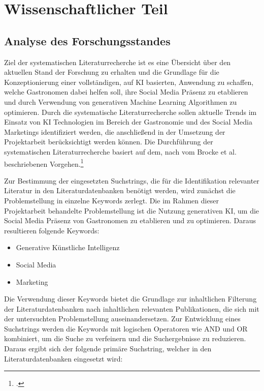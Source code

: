 \newpage
\section{Wissenschaftlicher Teil}

\subsection{Analyse des Forschungsstandes}
Ziel der systematischen Literaturrecherche ist es eine Übersicht über den aktuellen Stand der Forschung zu erhalten und die Grundlage für die Konzeptionierung einer vollständigen, auf \ac{KI} basierten, Anwendung zu schaffen, welche Gastronomen dabei helfen soll, ihre Social Media Präsenz zu etablieren und durch Verwendung von generativen Machine Learning Algorithmen zu optimieren.
Durch die systematische Literaturrecherche sollen aktuelle Trends im Einsatz von \ac{KI} Technologien im Bereich der Gastronomie und des Social Media Marketings identifiziert werden, die anschließend in der Umsetzung der Projektarbeit berücksichtigt werden können.
Die Durchführung der systematischen Literaturrecherche basiert auf dem, nach vom Brocke et al. beschriebenen Vorgehen.\footcite{brocke2015standing}

Zur Bestimmung der eingesetzten Suchstrings, die für die Identifikation relevanter Literatur in den Literaturdatenbanken benötigt werden, wird zunächst die Problemstellung in einzelne Keywords zerlegt.
Die im Rahmen dieser Projektarbeit behandelte Problemstellung ist die Nutzung generativen KI, um die Social Media Präsenz von Gastronomen zu etablieren und zu optimieren.
Daraus resultieren folgende Keywords:

\begin{itemize}
    \item Generative Künstliche Intelligenz
    \item Social Media
    \item Marketing
\end{itemize}

Die Verwendung dieser Keywords bietet die Grundlage zur inhaltlichen Filterung der Literaturdatenbanken nach inhaltlichen relevanten Publikationen, die sich mit der untersuchten Problemstellung auseinandersetzen.
Zur Entwicklung eines Suchstrings werden die Keywords mit logischen Operatoren wie AND und OR kombiniert, um die Suche zu verfeinern und die Suchergebnisse zu reduzieren.
Daraus ergibt sich der folgende primäre Suchstring, welcher in den Literaturdatenbanken eingesetzt wird:

